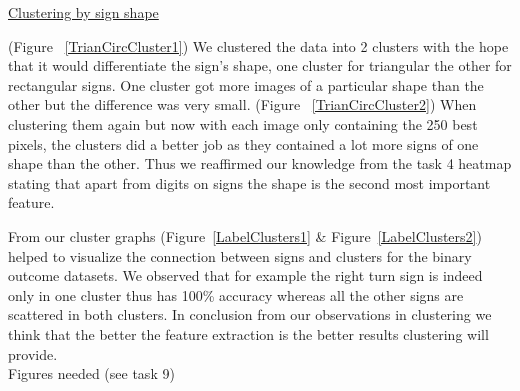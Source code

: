 \documentclass[11pt]{article}
\begin{document}
\underline{Clustering by sign shape}
\par
(Figure ~\ref{TrianCircCluster1}) We clustered the data into 2 clusters with the hope that it would differentiate the sign's shape, one cluster for triangular the other for rectangular signs. 
One cluster got more images of a particular shape than the other but the difference was very small.
(Figure ~\ref{TrianCircCluster2}) When clustering them again but now with each image only containing the 250 best pixels, the clusters did a better job as they contained a lot more signs of one shape than the other. Thus we reaffirmed our knowledge from the task 4 heatmap stating that apart from digits on signs the shape is the second most important feature. 
\par
From our cluster graphs (Figure~\ref{LabelClusters1} \& Figure~\ref{LabelClusters2}) helped to visualize the connection between signs and clusters for the binary outcome datasets. We observed that for example the right turn sign is indeed only in one cluster thus has 100\% accuracy whereas all the other signs are scattered in both clusters. 
In conclusion from our observations in clustering we think that the better the feature extraction is the better results clustering will provide. \\
{\huge Figures needed (see task 9)}
\end{document}
